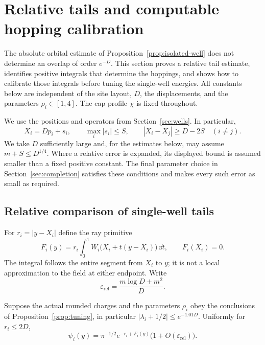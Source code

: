 \section{Relative tails and computable hopping calibration}
\label{sec:hopping}

The absolute orbital estimate of Proposition~\ref{prop:isolated-well}
does not determine an overlap of order $e^{-D}$.  This section proves a
relative tail estimate, identifies positive integrals that determine the
hoppings, and shows how to calibrate those integrals before tuning the
single-well energies.  All constants below are independent of the site
layout, $D$, the displacements, and the parameters $\rho_i\in[1,4]$.
The cap profile $\chi$ is fixed throughout.

We use the positions and operators from Section~\ref{sec:wells}.  In
particular,
\[
 X_i=Dp_i+s_i,\qquad \max_i|s_i|\le S,
 \qquad |X_i-X_j|\ge D-2S\quad(i\ne j).
\]
We take $D$ sufficiently large and, for the estimates below, may assume
$m+S\le D^{1/4}$.  Where a relative error is expanded, its displayed
bound is assumed smaller than a fixed positive constant.  The final
parameter choice in Section~\ref{sec:completion} satisfies these
conditions and makes every such error as small as required.

\subsection{Relative comparison of single-well tails}

For $r_i=|y-X_i|$ define the ray primitive
\begin{equation}
 F_i(y)=r_i\int_0^1 W_i\bigl(X_i+t(y-X_i)\bigr)\,\dd t,
 \qquad F_i(X_i)=0.
 \label{eq:ray-primitive}
\end{equation}
The integral follows the entire segment from $X_i$ to $y$; it is not
a local approximation to the field at either endpoint.  Write
\begin{equation}
 \varepsilon_{\mathrm{rel}}
   =\frac{m\log D+m^2}{D}.
 \label{eq:relative-tail-error}
\end{equation}

\begin{proposition}
\label{prop:relative-tail}
Suppose the actual rounded charges and the parameters $\rho_i$ obey
the conclusions of Proposition~\ref{prop:tuning}, in particular
$|\lambda_i+1/2|\le e^{-1.01D}$.  Uniformly for $r_i\le2D$,
\begin{equation}
 \psi_i(y)=\pi^{-1/2}e^{-r_i+F_i(y)}
       \bigl(1+O(\varepsilon_{\mathrm{rel}})\bigr).
 \label{eq:relative-tail}
\end{equation}
\end{proposition}

